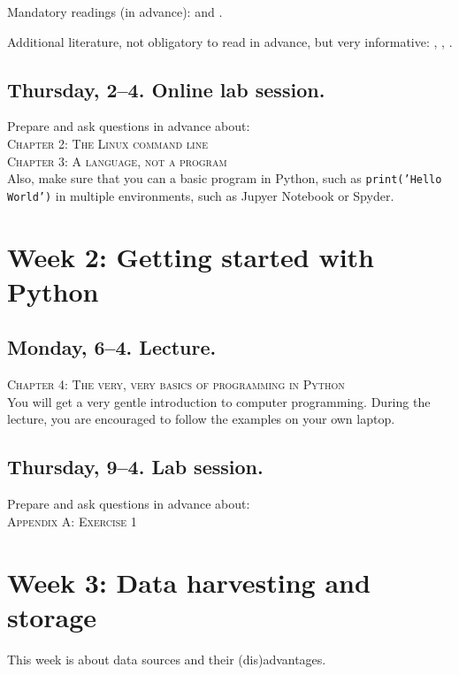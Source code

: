 Mandatory readings (in advance): \cite{boyd2012} and \cite{Kitchin2014}. 

Additional literature, not obligatory to read in advance, but very informative: \cite{Mahrt2013}, \cite{Vis2013}, \cite{Trilling2017a}.



\subsection*{Thursday, 2--4. Online lab session.}

Prepare and ask questions in advance about:\\
\textsc{ Chapter 2: The Linux command line}\\
\textsc{ Chapter 3: A language, not a program}\\

Also, make sure that you can a basic program in Python, such as \texttt{print('Hello World')} in multiple environments, such as Jupyer Notebook or Spyder.


\section*{Week 2: Getting started with Python}

\subsection*{Monday, 6--4. Lecture.}
\textsc{ Chapter 4: The very, very basics of programming in Python}\\
You will get a very gentle introduction to computer programming. During the lecture, you are encouraged to follow the examples on your own laptop.


\subsection*{Thursday, 9--4. Lab session.}
Prepare and ask questions in advance about:\\
\textsc{ Appendix A: Exercise 1}\\



\section*{Week 3: Data harvesting and storage}
This week is about data sources and their (dis)advantages. 

